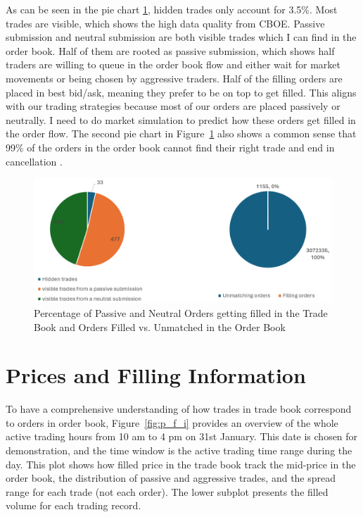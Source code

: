 As can be seen in the pie chart \ref{fig:p_of_AT_unma}, hidden trades only account for 3.5\%. Most trades are visible, which shows the high data quality from CBOE. Passive submission and neutral submission are both visible trades which I can find in the order book. Half of them are rooted as passive submission, which shows half traders are willing to queue in the order book flow and either wait for market movements or being chosen by aggressive traders. Half of the filling orders are placed in best bid/ask, meaning they prefer to be on top to get filled. This aligns with our trading strategies because most of our orders are placed passively or neutrally. I need to do market simulation to predict how these orders get filled in the order flow. The second pie chart in Figure~\ref{fig:p_of_AT_unma} also shows a common sense that 99\% of the orders in the order book cannot find their right trade and end in cancellation \citep{gould2013limitorderbooks}.

\begin{figure}[h]
    \centering
    \includegraphics[width=0.8\linewidth]{figures/percentage_of_AT_unmatch.png}
    \caption{Percentage of Passive and Neutral Orders getting filled in the Trade Book and Orders Filled vs. Unmatched in the Order Book}
    \label{fig:p_of_AT_unma}
\end{figure}


\section{Prices and Filling Information} \label{sec:price}
To have a comprehensive understanding of how trades in trade book correspond to orders in order book, Figure~\ref{fig:p_f_i} provides an overview of the whole active trading hours from 10 am to 4 pm on 31st January. This date is chosen for demonstration, and the time window is the active trading time range during the day. This plot shows how filled price in the trade book track the mid-price in the order book, the distribution of passive and aggressive trades, and the spread range for each trade (not each order). The lower subplot presents the filled volume for each trading record.

